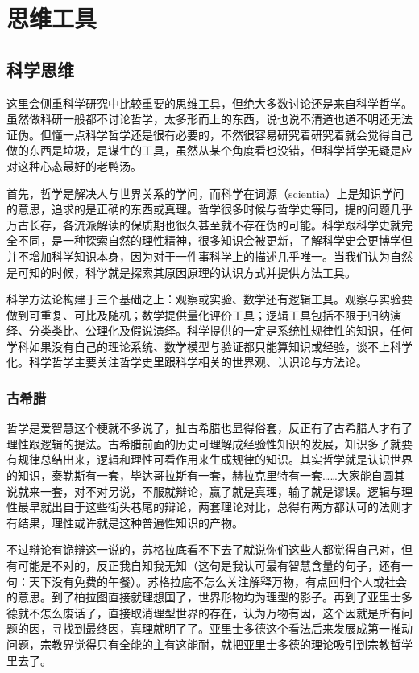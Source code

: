\documentclass[]{tufte-book}
\begin{document}
\hypertarget{thought}{%
\chapter{思维工具}\label{thought}}

\hypertarget{ux79d1ux5b66ux601dux7ef4}{%
\section{科学思维}\label{ux79d1ux5b66ux601dux7ef4}}

这里会侧重科学研究中比较重要的思维工具，但绝大多数讨论还是来自科学哲学。虽然做科研一般都不讨论哲学，太多形而上的东西，说也说不清道也道不明还无法证伪。但懂一点科学哲学还是很有必要的，不然很容易研究着研究着就会觉得自己做的东西是垃圾，是谋生的工具，虽然从某个角度看也没错，但科学哲学无疑是应对这种心态最好的老鸭汤。

首先，哲学是解决人与世界关系的学问，而科学在词源（scientia）上是知识学问的意思，追求的是正确的东西或真理。哲学很多时候与哲学史等同，提的问题几乎万古长存，各流派解读的保质期也很久甚至就不存在伪的可能。科学跟科学史就完全不同，是一种探索自然的理性精神，很多知识会被更新，了解科学史会更博学但并不增加科学知识本身，因为对于一件事科学上的描述几乎唯一。当我们认为自然是可知的时候，科学就是探索其原因原理的认识方式并提供方法工具。

科学方法论构建于三个基础之上：观察或实验、数学还有逻辑工具。观察与实验要做到可重复、可比及随机；数学提供量化评价工具；逻辑工具包括不限于归纳演绎、分类类比、公理化及假说演绎。科学提供的一定是系统性规律性的知识，任何学科如果没有自己的理论系统、数学模型与验证都只能算知识或经验，谈不上科学化。科学哲学主要关注哲学史里跟科学相关的世界观、认识论与方法论。

\hypertarget{ux53e4ux5e0cux814a}{%
\subsection{古希腊}\label{ux53e4ux5e0cux814a}}

哲学是爱智慧这个梗就不多说了，扯古希腊也显得俗套，反正有了古希腊人才有了理性跟逻辑的提法。古希腊前面的历史可理解成经验性知识的发展，知识多了就要有规律总结出来，逻辑和理性可看作用来生成规律的知识。其实哲学就是认识世界的知识，泰勒斯有一套，毕达哥拉斯有一套，赫拉克里特有一套\ldots\ldots 大家能自圆其说就来一套，对不对另说，不服就辩论，赢了就是真理，输了就是谬误。逻辑与理性最早就出自于这些街头巷尾的辩论，两套理论对比，总得有两方都认可的法则才有结果，理性或许就是这种普遍性知识的产物。

不过辩论有诡辩这一说的，苏格拉底看不下去了就说你们这些人都觉得自己对，但有可能是不对的，反正我自知我无知（这句是我认可最有智慧含量的句子，还有一句：天下没有免费的午餐）。苏格拉底不怎么关注解释万物，有点回归个人或社会的意思。到了柏拉图直接就理想国了，世界形物均为理型的影子。再到了亚里士多德就不怎么废话了，直接取消理型世界的存在，认为万物有因，这个因就是所有问题的因，寻找到最终因，真理就明了了。亚里士多德这个看法后来发展成第一推动问题，宗教界觉得只有全能的主有这能耐，就把亚里士多德的理论吸引到宗教哲学里去了。
\end{document}
